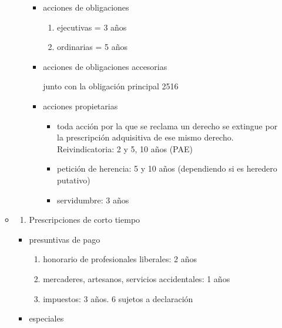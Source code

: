 \documentclass[]{article}
\providecommand{\tightlist}{%
  \setlength{\itemsep}{0pt}\setlength{\parskip}{0pt}}
\begin{document}
\begin{itemize}
\begin{itemize}
\begin{enumerate}
      \begin{itemize}
      \item
        acciones de obligaciones

        \begin{enumerate}
        \def\labelenumii{\arabic{enumii}.}
        \tightlist
        \item
          ejecutivas = 3 años
        \item
          ordinarias = 5 años
        \end{enumerate}
      \item
        acciones de obligaciones accesorias

        junto con la obligación principal 2516
      \item
        acciones propietarias

        \begin{itemize}
        \tightlist
        \item
          toda acción por la que se reclama un derecho se extingue por
          la prescripción adquisitiva de ese mismo derecho.
          Reivindicatoria: 2 y 5, 10 años (PAE)
        \item
          petición de herencia: 5 y 10 años (dependiendo si es heredero
          putativo)
        \item
          servidumbre: 3 años
        \end{itemize}
      \end{itemize}
    \end{enumerate}
  \item
    \begin{enumerate}
    \def\labelenumi{\Alph{enumi})}
    \setcounter{enumi}{1}
    \tightlist
    \item
      Prescripciones de corto tiempo
    \end{enumerate}

    \begin{itemize}
    \tightlist
    \item
      presuntivas de pago

      \begin{enumerate}
      \def\labelenumi{\arabic{enumi}.}
      \tightlist
      \item
        honorario de profesionales liberales: 2 años
      \item
        mercaderes, artesanos, servicios accidentales: 1 años
      \item
        impuestos: 3 años. 6 sujetos a declaración
      \end{enumerate}
    \item
      especiales


\end{itemize}
\end{itemize}
\end{itemize}
\end{document}
